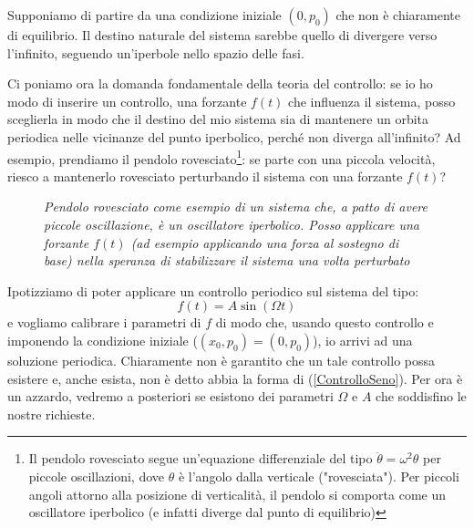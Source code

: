 \documentclass[a4paper,openany]{article}
\begin{document}
	Supponiamo di partire da una condizione iniziale $(0,p_{0})$ che non è chiaramente di equilibrio. Il destino naturale del sistema sarebbe quello di divergere verso l'infinito, seguendo un'iperbole nello spazio delle fasi.
	
	Ci poniamo ora la domanda fondamentale della teoria del controllo: se io ho modo di inserire un controllo, una forzante $f(t)$ che influenza il sistema, posso sceglierla in modo che il destino del mio sistema sia di mantenere un orbita periodica nelle vicinanze del punto iperbolico, perché non diverga all'infinito? Ad esempio, prendiamo il pendolo rovesciato\footnote{Il pendolo rovesciato segue un'equazione differenziale del tipo $\ddot{\theta} = \omega^{2}\theta$ per piccole oscillazioni, dove $\theta$ è l'angolo dalla verticale ("rovesciata"). Per piccoli angoli attorno alla posizione di verticalità, il pendolo si comporta come un oscillatore iperbolico (e infatti diverge dal punto di equilibrio)}: se parte con una piccola velocità, riesco a mantenerlo rovesciato perturbando il sistema con una forzante $f(t)$?
	\begin{figure}
		\centering 
		\caption{\textit{Pendolo rovesciato come esempio di un sistema che, a patto di avere piccole oscillazione, è un oscillatore iperbolico. Posso applicare una forzante $f(t)$ (ad esempio applicando una forza al sostegno di base) nella speranza di stabilizzare il sistema una volta perturbato}}
	\end{figure}
	
	Ipotizziamo di poter applicare un controllo periodico sul sistema del tipo:
	\begin{equation}
		f(t) = A \sin(\Omega t)
		\label{ControlloSeno}
	\end{equation}
	e vogliamo calibrare i parametri di $f$ di modo che, usando questo controllo e imponendo la condizione iniziale ($(x_{0}, p_{0}) = (0,p_{0})$), io arrivi ad una soluzione periodica. Chiaramente non è garantito che un tale controllo possa esistere e, anche esista, non è detto abbia la forma di (\ref{ControlloSeno}). Per ora è un azzardo, vedremo a posteriori se esistono dei parametri $\Omega$ e $A$ che soddisfino le nostre richieste.
	
\end{document}
